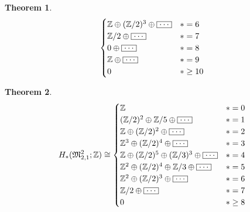 \documentclass[12pt]{beamer}            %
\newcommand{\bldots}{\raisebox{.5ex}{\fbox{$\ldots$}}}
\newtheorem*{thm*}{Theorem}
\begin{document}
\begin{frame}
{\begin{thm*}
\[\begin{cases}
                \mathbb Z \oplus (\mathbb Z/2)^3  \oplus \bldots                & \ast = 6\\
                \mathbb Z / 2  \oplus \bldots   & \ast = 7\\
                0  \oplus \bldots               & \ast = 8\\
                \mathbb Z  \oplus \bldots       & \ast = 9\\
                0                               & \ast \ge 10\\
            \end{cases}
        \]
        \end{thm*}
    }
\end{frame}

\begin{frame}
    \begin{thm*}
        \[
            H_\ast( \mathfrak{M}_{2,1}^2; \mathbb Z ) \cong 
            \begin{cases}
                \mathbb Z           & \ast = 0\\
                (\mathbb Z/2)^2 \oplus \mathbb Z/5 \oplus \bldots    & \ast = 1\\
                \mathbb Z \oplus (\mathbb Z/2)^2 \oplus \bldots      & \ast = 2\\
                \mathbb Z^3 \oplus (\mathbb Z/2)^4 \oplus \bldots    & \ast = 3\\
                \mathbb Z \oplus (\mathbb Z/2)^5 \oplus (\mathbb Z/3)^3 \oplus \bldots       & \ast = 4\\
                \mathbb Z^2 \oplus (\mathbb Z/2)^4 \oplus \mathbb Z/3 \oplus \bldots         & \ast = 5\\
                \mathbb Z^2 \oplus (\mathbb Z/2)^3 \oplus \bldots    & \ast = 6\\
                \mathbb Z/2 \oplus \bldots                           & \ast = 7\\
                0                   & \ast \ge 8\\
            \end{cases}
        \]  
    \end{thm*}
\end{frame}
\end{document}
